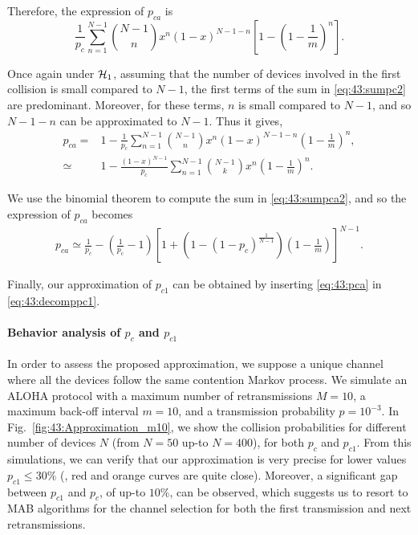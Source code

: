 Therefore, the expression of $p_{ca}$ is
\begin{equation}\label{eq:43:sumpc2}
	\frac{1}{p_c} \sum_{n=1}^{N-1}{N-1 \choose n} x^n \left(1-x\right)^{N-1-n}\left[1-\left( 1-\frac{1}{m}\right)^n \right].
\end{equation}

Once again under $\mathcal{H}_{1}$, assuming that the number of devices involved in the first collision is small compared to $N-1$, the first terms of the sum in \eqref{eq:43:sumpc2} are predominant. Moreover, for these terms, $n$ is small compared to $N-1$, and so $N-1-n$ can be approximated to $N-1$. Thus it gives,
\begin{align}\label{eq:43:sumpca2}
	p_{ca} = & 1- \frac{1}{p_c}\sum_{n=1}^{N-1}{N-1 \choose n} x^n \left(1-x\right)^{N-1-n}\left( 1-\frac{1}{m}\right)^n,\nonumber\\
	\simeq & 1- \frac{\left(1-x\right)^{N-1}}{p_c}\sum_{n=1}^{N-1}{N-1 \choose k} x^n \left( 1-\frac{1}{m}\right)^n.
\end{align}

We use the binomial theorem to compute the sum in \eqref{eq:43:sumpca2}, and so the expression of $p_{ca}$ becomes
\begin{align}\label{eq:43:pca}
	p_{ca} \simeq \frac{1}{p_c} - \left(\frac{1}{p_c}-1\right)\left[ 1+\left(1-\left(1-p_c\right)^{\frac{1}{N-1}}\right)\left(1-\frac{1}{m}\right)\right]^{N-1}.
\end{align}

Finally, our approximation of $p_{c1}$ can be obtained by inserting \eqref{eq:43:pca} in \eqref{eq:43:decomppc1}.



\paragraph{Behavior analysis of $p_{c}$ and $p_{c1}$}\label{sub:43:numericalValidationPC1PC}

In order to assess the proposed approximation, we suppose a unique channel where all the devices follow the same contention Markov process.
We simulate an ALOHA protocol with a maximum number of retransmissions $M=10$, a maximum back-off interval $m=10$, and a transmission probability $p=10^{-3}$.
%
In Fig.~\ref{fig:43:Approximation_m10}, we show the collision probabilities for different number of devices $N$ (from $N=50$ up-to $N=400$), for both $p_{c}$ and $p_{c1}$.
%
From this simulations, we can verify that our approximation is very precise for lower values $p_{c1} \leq 30 \%$ (\ie, red and orange curves are quite close).
Moreover, a significant gap between $p_{c1}$ and $p_c$,
of up-to $10\%$, can be observed,
which suggests us to resort to MAB algorithms for the channel selection for both the first transmission and next retransmissions.

